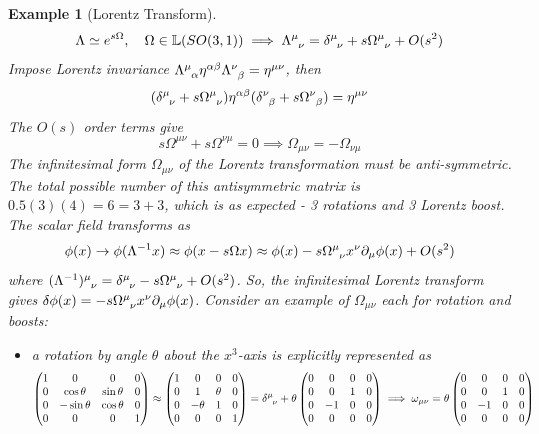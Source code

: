 \documentclass[a4paper]{article}
\newtheorem{eg}{Example}[section]
\theoremstyle{new}
\begin{document}
\begin{eg}[Lorentz Transform]
$$\Lambda\simeq e^{s\Omega},\quad\Omega\in\mathbb{L}(SO(3,1))\implies\tensor*{\Lambda}{*_{}^{\mu}_{\nu}}=\tensor*{\delta}{*_{}^{\mu}_{\nu}}+s\tensor*{\Omega}{*_{}^{\mu}_{\nu}}+O(s^2)$$
Impose Lorentz invariance $\tensor*{\Lambda}{*_{}^{\mu}_{\alpha}}\eta^{\alpha\beta}\tensor*{\Lambda}{*_{}^{\nu}_{\beta}}=\eta^{\mu\nu}$, then
$$(\tensor*{\delta}{*_{}^{\mu}_{\nu}}+s\tensor*{\Omega}{*_{}^{\mu}_{\nu}})\eta^{\alpha\beta}(\tensor*{\delta}{*_{}^{\nu}_{\beta}}+s\tensor*{\Omega}{*_{}^{\nu}_{\beta}})=\eta^{\mu\nu}$$
The $O(s)$ order terms give
$$s\Omega^{\mu\nu}+s\Omega^{\nu\mu}=0\implies\Omega_{\mu\nu}=-\Omega_{\nu\mu}$$
The infinitesimal form $\Omega_{\mu\nu}$ of the Lorentz transformation must be anti-symmetric. The total possible number of this antisymmetric matrix is $0.5(3)(4)=6=3+3$, which is as expected - 3 rotations and 3 Lorentz boost. The scalar field transforms as
$$\phi(x)\rightarrow\phi(\Lambda^{-1}x)\approx\phi(x-s\Omega x)\approx\phi(x)-s\tensor*{\Omega}{*_{}^{\mu}_{\nu}}x^\nu\partial_\mu\phi(x)+O(s^2)$$
where $\tensor*{(\Lambda^{-1})}{*_{}^{\mu}_{\nu}}=\tensor*{\delta}{*_{}^{\mu}_{\nu}}-s\tensor*{\Omega}{*_{}^{\mu}_{\nu}}+O(s^2)$. So, the infinitesimal Lorentz transform gives $\delta\phi(x)=-s\tensor*{\Omega}{*_{}^{\mu}_{\nu}}x^\nu\partial_\mu\phi(x)$. Consider an example of $\Omega_{\mu\nu}$ each for rotation and boosts:
\begin{itemize}
    \item a rotation by angle $\theta$ about the $x^3$-axis is explicitly represented as
    $$\begin{pmatrix}1&0&0&0\\0&\cos\theta&\sin\theta&0\\0&-\sin\theta&\cos\theta&0\\0&0&0&1\\\end{pmatrix}\approx\begin{pmatrix}1&0&0&0\\0&1&\theta&0\\0&-\theta&1&0\\0&0&0&1\\\end{pmatrix}=\tensor*{\delta}{*_{}^{\mu}_{\nu}}+\theta\begin{pmatrix}0&0&0&0\\0&0&1&0\\0&-1&0&0\\0&0&0&0\\\end{pmatrix}\implies\omega_{\mu\nu}=\theta\begin{pmatrix}0&0&0&0\\0&0&1&0\\0&-1&0&0\\0&0&0&0\\\end{pmatrix}$$

\end{itemize}
\end{eg}
\end{document}
